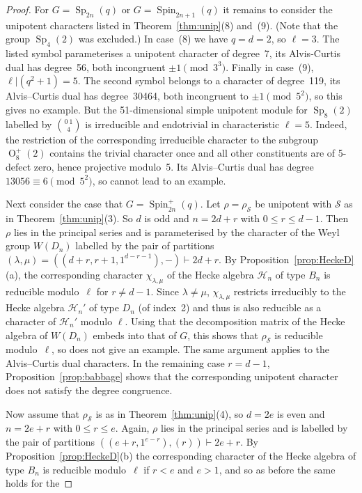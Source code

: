 \documentclass{ert-l}
\newcommand{\cH}{{\mathcal{H}}}
\newcommand{\cS}{{\mathcal{S}}}
\newcommand{\Sp}{{\operatorname{Sp}}}
\newcommand{\Spin}{{\operatorname{Spin}}}
\newcommand{\OO}{{\operatorname{O}}}
\let\la=\lambda
\theoremstyle{definition}
\theoremstyle{remark}
\begin{document}
\begin{proof}
For $G=\Sp_{2n}(q)$ or $G=\Spin_{2n+1}(q)$ it remains to consider the unipotent
characters listed in Theorem~\ref{thm:unip}(8) and~(9). (Note that the group
$\Sp_4(2)$ was excluded.) In case~(8)
we have $q=d=2$, so $\ell=3$. The listed symbol parameterises a unipotent
character of degree~7, its Alvis-Curtis dual has degree~56, both incongruent
$\pm1\pmod{3^3}$. Finally in case~(9), $\ell|(q^2+1)=5$. The second symbol
belongs to a character of degree~119, its Alvis--Curtis dual has degree~30464,
both incongruent to $\pm1\pmod{5^2}$, so this gives no example.
But the 51-dimensional simple unipotent module for $\Sp_8(2)$ labelled by
$\binom{0\ 1}{4}$ is irreducible and endotrivial in characteristic $\ell=5$.
Indeed, the restriction of the corresponding irreducible character to the
subgroup $\OO_8^+(2)$ contains the trivial character once and all other
constituents are of 5-defect zero, hence projective modulo~5. Its Alvis--Curtis
dual has degree~$13056\equiv6\pmod{5^2}$, so cannot lead to an example.
\par\medskip
Next consider the case that $G=\Spin_{2n}^+(q)$. Let $\rho=\rho_\cS$ be
unipotent with $\cS$ as in
Theorem~\ref{thm:unip}(3). So $d$ is odd and $n=2d+r$ with $0\le r\le d-1$.
Then $\rho$ lies in the principal series and is parameterised by the character
of the Weyl group $W(D_n)$ labelled by the pair of partitions
$(\la,\mu)=((d+r,r+1,1^{d-r-1}),-)\vdash 2d+r$. By
Proposition~\ref{prop:HeckeD}(a), the corresponding character $\chi_{\la,\mu}$
of the Hecke algebra $\cH_n$ of type $B_n$ is reducible modulo~$\ell$ for
$r\ne d-1$. Since $\la\ne\mu$, $\chi_{\la,\mu}$ restricts irreducibly to the
Hecke algebra $\cH_n'$ of type $D_n$ (of index~2) and thus is also reducible as
a character of $\cH_n'$ modulo $\ell$. Using that the decomposition matrix of
the Hecke algebra of $W(D_n)$ embeds into that of $G$, this shows that
$\rho_\cS$ is reducible modulo~$\ell$, so does not give an example. The same
argument applies to the Alvis--Curtis dual characters. In the remaining case
$r=d-1$, Proposition~\ref{prop:babbage} shows that the corresponding unipotent
character does not satisfy the degree congruence.
\par
Now assume that $\rho_\cS$ is as in Theorem~\ref{thm:unip}(4), so $d=2e$ is
even and $n=2e+r$ with $0\le r\le e$. Again, $\rho$ lies in the principal
series and is labelled by the pair of partitions
$((e+r,1^{e-r}),(r))\vdash 2e+r$. By Proposition~\ref{prop:HeckeD}(b) the
corresponding character of the Hecke algebra of type $B_n$ is reducible
modulo~$\ell$ if $r<e$ and $e>1$, and so as before the same holds for the

\end{proof}
\end{document}
